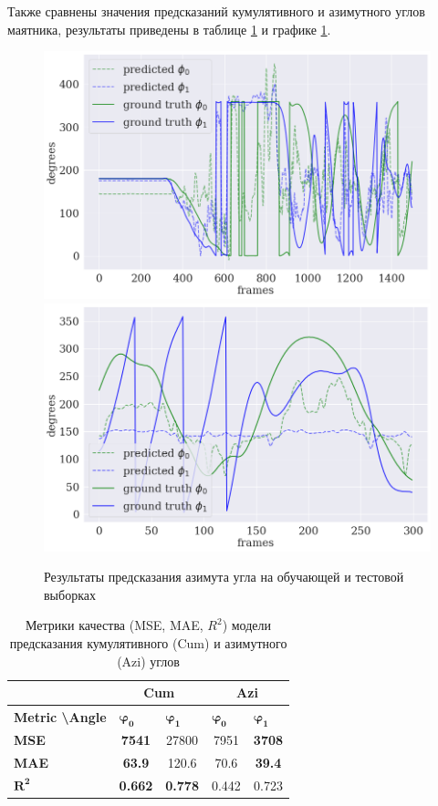 \documentclass[a4paper,14pt]{article}
\theoremstyle{plain} %
\theoremstyle{definition} %
\theoremstyle{remark} %
\begin{document}
	Также сравнены значения предсказаний кумулятивного и азимутного углов маятника, результаты приведены в таблице \ref{tbl:cum_vs_avi} и графике \ref{fig:azi_train_and_test}.

	\begin{figure}[bhtp]
		\centering
		\includegraphics[width=0.7\linewidth]{train_azi_example}
		\includegraphics[width=0.7\linewidth]{test_azi_example}
		\caption{Результаты предсказания азимута угла на обучающей и тестовой выборках}
		\label{fig:azi_train_and_test}
	\end{figure}

	\begin{table}[]
		\begin{tabular}{l|cc|cc|}
			\cline{2-5}
			& \multicolumn{2}{c|}{\textbf{Cum}} & \multicolumn{2}{c|}{\textbf{Azi}} \\ \hline
			\multicolumn{1}{|l|}{\textbf{Metric \textbackslash Angle}} & \multicolumn{1}{l|}{$\mathbf{\varphi_0}$} & \multicolumn{1}{l|}{$\mathbf{\varphi_1}$} & \multicolumn{1}{l|}{$\mathbf{\varphi_0}$} & \multicolumn{1}{l|}{$\mathbf{\varphi_1}$} \\ \hline
			\multicolumn{1}{|l|}{\textbf{MSE}} & \multicolumn{1}{c|}{\textbf{7541}} & 27800 & \multicolumn{1}{c|}{7951} & \textbf{3708} \\ \hline
			\multicolumn{1}{|l|}{\textbf{MAE}} & \multicolumn{1}{c|}{\textbf{63.9}} & 120.6 & \multicolumn{1}{c|}{70.6} & \textbf{39.4} \\ \hline
			\multicolumn{1}{|l|}{$\mathbf{R^2}$} & \multicolumn{1}{c|}{\textbf{0.662}} & \textbf{0.778} & \multicolumn{1}{c|}{0.442} & 0.723 \\ \hline
		\end{tabular}
		\label{tbl:cum_vs_avi}
		\caption{Метрики качества (MSE, MAE, $R^2$) модели предсказания кумулятивного (Cum) и азимутного (Azi) углов}
	\end{table}
	
\end{document}
